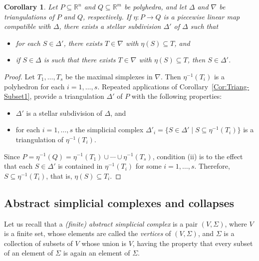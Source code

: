 \documentclass[reqno, draft]{amsart}
\newtheorem{corollary}[theorem]{Corollary}
\theoremstyle{definition}
\begin{document}
\begin{corollary}\label{Cor:RefineByBlowUps}
Let $P\subseteq{\mathbb{R}}^n$  and $Q\subseteq{\mathbb{R}}^m$ be polyhedra, 
and let $\Delta$ and $\nabla$ be triangulations 
of $P$ and $Q$, respectively. 
If $\eta\colon P \to Q$ is 
a piecewise linear map compatible with $\Delta$, 
there exists a stellar subdivision $\Delta'$ of $\Delta$ such that 
\begin{itemize}
\item[(i)]for each $S\in\Delta'$, there exists $T\in\nabla$ with 
$\eta(S)\subseteq T$, and
\item[(ii)] if $S\in\Delta$ is such that there exists $T\in\nabla$ 
with $\eta(S)\subseteq T$, then $S\in\Delta'$.
\end{itemize}
\end{corollary}

\begin{proof}
Let $T_1,\ldots,T_s$ be the maximal simplexes in $\nabla$. 
Then $\eta^{-1}(T_i)$ is a polyhedron  for each $i=1,\ldots,s$. 
Repeated applications of Corollary~\ref{Cor:Triang-Subset1}, 
provide a triangulation $\Delta'$ of $P$ 
with the following properties:
\begin{itemize}
  \item[(i)] $\Delta'$ is a stellar subdivision of $\Delta$, and
    \item[(ii)] for each $i=1,\ldots,s$ the simplicial complex
 $\Delta'_{i}=\{S\in\Delta'\mid S\subseteq \eta^{-1}(T_i)\}$ 
is a triangulation of $\eta^{-1}(T_i)$.
\end{itemize}
Since 
$P=\eta^{-1}(Q)=\eta^{-1}(T_1)\cup\cdots\cup \eta^{-1}(T_s)$,
condition (ii) is to the effect that each $S\in \Delta'$ 
is contained in $\eta^{-1}(T_i)$ for some $i=1,\ldots,s$. 
Therefore, $S\subseteq \eta^{-1}(T_i)$, that is, 
$\eta(S)\subseteq T_i$. 
\end{proof}

\subsection{Abstract simplicial complexes and collapses}\label{Subsec:AbsSimCom}

Let us recall that 
a {\it {\rm (}finite{\rm)} abstract simplicial complex} 
is a pair $({V},\Sigma)$, where ${V}$ is a finite set, 
whose elements are called the {\it vertices} of $({V},\Sigma)$,
and $\Sigma$ is a collection of subsets of $V$
whose union is ${V}$,
having the property that every subset of an element of $\Sigma$ is
again an element of $\Sigma$.
\end{document}
